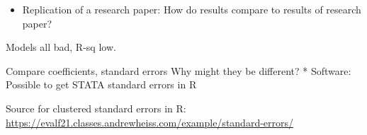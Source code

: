 \documentclass[
]{article}
\providecommand{\tightlist}{%
  \setlength{\itemsep}{0pt}\setlength{\parskip}{0pt}}
\begin{document}
\begin{itemize}
\tightlist
\item
  Replication of a research paper: How do results compare to results of
  research paper?
\end{itemize}

Models all bad, R-sq low.

Compare coefficients, standard errors Why might they be different? *
Software: Possible to get STATA standard errors in R

Source for clustered standard errors in R:
\url{https://evalf21.classes.andrewheiss.com/example/standard-errors/}
\end{document}
